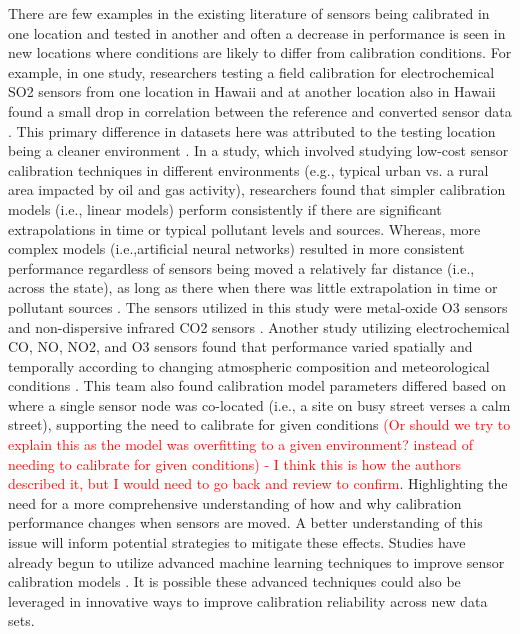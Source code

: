 \documentclass[journal abbreviation, manuscript]{copernicus}
\newcommand\todo[1]{\textcolor{red}{#1}}
\begin{document}
There are few examples in the existing literature of sensors being calibrated in one location and tested in another and often a decrease in performance is seen in new locations where conditions are likely to differ from calibration conditions.  For example, in one study, researchers testing a field calibration for electrochemical SO2 sensors from one location in Hawaii and at another location also in Hawaii found a small drop in correlation between the reference and converted sensor data \citep{Hagan2018}. This primary difference in datasets here was attributed to the testing location being a cleaner environment \citep{Hagan2018}. In a study, which involved studying low-cost sensor calibration techniques in different environments (e.g., typical urban vs. a rural area impacted by oil and gas activity), researchers found that simpler calibration models (i.e., linear models) perform consistently if there are significant extrapolations in time or typical pollutant levels and sources. Whereas, more complex models (i.e.,artificial neural networks) resulted in more consistent performance regardless of sensors being moved a relatively far distance (i.e., across the state), as long as there when there was little extrapolation in time or pollutant sources \citep{CaseyTesting}. The sensors utilized in this study were metal-oxide O3 sensors and non-dispersive infrared CO2 sensors \citep{CaseyTesting}. Another study utilizing electrochemical CO, NO, NO2, and O3 sensors found that performance varied spatially and temporally according to changing atmospheric composition and meteorological conditions \citep{Castell2017}. This team also found calibration model parameters differed based on where a single sensor node was co-located (i.e., a site on busy street verses a calm street), supporting the need to calibrate for given conditions \citep{Castell2017} \todo{(Or should we try to explain this as the model was overfitting to a given environment? instead of needing to calibrate for given conditions) - I think this is how the authors described it, but I would need to go back and review to confirm}. Highlighting the need for a more comprehensive understanding of how and why calibration performance changes when sensors are moved. A better understanding of this issue will inform potential strategies to mitigate these effects. Studies have already begun to utilize advanced machine learning techniques to improve sensor calibration models \citep{Zimmerman2018, DeVito2009, Casey2018Performance}. It is possible these advanced techniques could also be leveraged in innovative ways to improve calibration reliability across new data sets.
\end{document}
